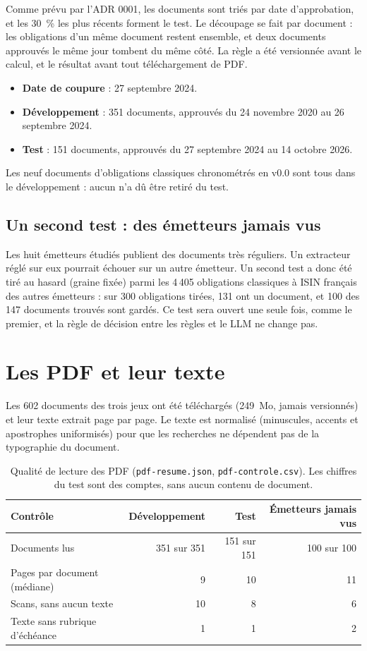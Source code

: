 \documentclass[11pt,a4paper]{article}
\begin{document}
Comme prévu par l'ADR 0001, les documents sont triés par date d'approbation, et les 30~\% les plus récents forment le test. Le découpage se fait par document : les obligations d'un même document restent ensemble, et deux documents approuvés le même jour tombent du même côté. La règle a été versionnée avant le calcul, et le résultat avant tout téléchargement de PDF.

\begin{itemize}
  \item \textbf{Date de coupure} : 27 septembre 2024.
  \item \textbf{Développement} : 351 documents, approuvés du 24 novembre 2020 au 26 septembre 2024.
  \item \textbf{Test} : 151 documents, approuvés du 27 septembre 2024 au 14 octobre 2026.
\end{itemize}

Les neuf documents d'obligations classiques chronométrés en v0.0 sont tous dans le développement : aucun n'a dû être retiré du test.

\subsection{Un second test : des émetteurs jamais vus}

Les huit émetteurs étudiés publient des documents très réguliers. Un extracteur réglé sur eux pourrait échouer sur un autre émetteur. Un second test a donc été tiré au hasard (graine fixée) parmi les 4\,405 obligations classiques à ISIN français des autres émetteurs : sur 300 obligations tirées, 131 ont un document, et 100 des 147 documents trouvés sont gardés. Ce test sera ouvert une seule fois, comme le premier, et la règle de décision entre les règles et le LLM ne change pas.

\section{Les PDF et leur texte}

Les 602 documents des trois jeux ont été téléchargés (249~Mo, jamais versionnés) et leur texte extrait page par page. Le texte est normalisé (minuscules, accents et apostrophes uniformisés) pour que les recherches ne dépendent pas de la typographie du document.

\begin{table}[H]
\small
\begin{tabularx}{\linewidth}{Yrrr}
\toprule
\textbf{Contrôle} & \textbf{Développement} & \textbf{Test} & \textbf{Émetteurs jamais vus} \\
\midrule
Documents lus & 351 sur 351 & 151 sur 151 & 100 sur 100 \\
Pages par document (médiane) & 9 & 10 & 11 \\
Scans, sans aucun texte & 10 & 8 & 6 \\
Texte sans rubrique d'échéance & 1 & 1 & 2 \\
\bottomrule
\end{tabularx}
\caption{Qualité de lecture des PDF (\texttt{pdf-resume.json}, \texttt{pdf-controle.csv}). Les chiffres du test sont des comptes, sans aucun contenu de document.}
\end{table}
\end{document}
